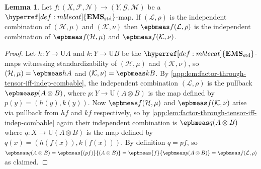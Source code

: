 \documentclass[
  sigconf,
  screen, ]{acmart}
\theoremstyle{definition}
\newtheorem{lemma}[theorem]{Lemma}
\newcommand\calF{\mathcal F}
\newcommand\calG{\mathcal G}
\newcommand\calH{\mathcal H}
\newcommand\calK{\mathcal K}
\newcommand\calL{\mathcal L}
\newcommand\calM{\mathcal M}
\newcommand\calN{\mathcal N}
\newcommand\nref[2]{\hyperref[#1]{#2}} \newcommand\checkhigh{{\huge{\color{red}\textbf{TODO: check}}}}
\newcommand\texforgetmu{\mathrm{U}}
\newcommand\forgetmu{{\nref{def:forgetmu}{\texforgetmu}}}
\newcommand\texStdMble{\mathbf{EMS}_{\rm std}}
\newcommand\StdMble{{\nref{def:mblecat}{\texStdMble}}}
\begin{document}
\begin{lemma} \label{app:lem:icomb-stablepb}
  Let $f : (X,\calF,\calN)\to(Y,\calG,\calM)$
  be a $\StdMble$-map.
  If $(\calL,\rho)$ is the independent combination
  of $(\calH,\mu)$ and $(\calK,\nu)$
  then 
  $\epbmeas f{(\calL,\rho)}$ is the independent combination
  of $\epbmeas f{(\calH,\mu)}$ and $\epbmeas f{(\calK,\nu)}$.
\end{lemma}
\begin{proof}
  Let $h : Y\to \forgetmu A$ and $k : Y\to\forgetmu B$
  be the $\StdMble$-maps witnessing standardizability
  of $(\calH,\mu)$ and $(\calK,\nu)$,
  so $(\calH,\mu) = \epbmeas hA$ and $(\calK,\nu)=\epbmeas kB$.
  By \cref{app:lem:factor-through-tensor-iff-indep-combable},
  the independent combination $(\calL,\rho)$
  is the pullback $\epbmeas p{(A\otimes B)}$,
  where $p : Y\to\forgetmu (A\otimes B)$
  is the map defined by $p(y) = (h(y),k(y))$.
  Now $\epbmeas f{(\calH,\mu)}$ and $\epbmeas f{(\calK,\nu)}$
  arise via pullback from $hf$ and $kf$ respectively,
  so by \cref{app:lem:factor-through-tensor-iff-indep-combable}
  again their independent combination
  is $\epbmeas q{(A\otimes B)}$
  where $q : X\to\forgetmu (A\otimes B)$
  is the map defined by $q(x) = (h(f(x)),k(f(x)))$.
  By definition $q = pf$, so
  $\epbmeas q{(A\otimes B)} 
  = \epbmeas{(pf)}{(A\otimes B)}
  = \epbmeas{f}{\epbmeas p{(A\otimes B)}}
  = \epbmeas f{(\calL,\rho)}$
  as claimed.
\end{proof}
\end{document}
